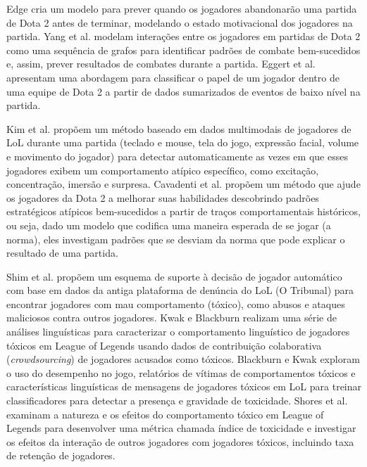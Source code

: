 Edge \cite{edge2013predicting} cria um modelo para prever quando os jogadores abandonarão uma partida de Dota 2 antes de terminar, modelando o estado motivacional dos jogadores na partida. Yang et al. \cite{yang2014identifying} modelam interações entre os jogadores em partidas de Dota 2 como uma sequência de grafos para identificar padrões de combate bem-sucedidos e, assim, prever resultados de combates durante a partida. Eggert et al. \cite{eggert2015classification} apresentam uma abordagem para classificar o papel de um jogador dentro de uma equipe de Dota 2 a partir de dados sumarizados de eventos de baixo nível na partida.

Kim et al. \cite{kim2015efficiently} propõem um método baseado em dados multimodais de jogadores de LoL durante uma partida (teclado e mouse, tela do jogo, expressão facial, volume e movimento do jogador) para detectar automaticamente as vezes em que esses jogadores exibem um comportamento atípico específico, como excitação, concentração, imersão e surpresa. Cavadenti et al. \cite{cavadenti2016did} propõem um método que ajude os jogadores da Dota 2 a melhorar suas habilidades descobrindo padrões estratégicos atípicos bem-sucedidos a partir de traços comportamentais históricos, ou seja, dado um modelo que codifica uma maneira esperada de se jogar (a norma), eles investigam padrões que se desviam da norma que pode explicar o resultado de uma partida.

Shim et al. \cite{shim2014decision} propõem um esquema de suporte à decisão de jogador automático com base em dados da antiga plataforma de denúncia do LoL (O Tribunal) para encontrar jogadores com mau comportamento (tóxico), como abusos e ataques maliciosos contra outros jogadores. Kwak e Blackburn \cite{kwak2014linguistic} realizam uma série de análises linguísticas para caracterizar o comportamento linguístico de jogadores tóxicos em League of Legends usando dados de contribuição colaborativa (\textit{crowdsourcing}) de jogadores acusados como tóxicos. Blackburn e Kwak \cite{blackburn2014stfu} exploram o uso do desempenho no jogo, relatórios de vítimas de comportamentos tóxicos e características linguísticas de mensagens de jogadores tóxicos em LoL para treinar classificadores para detectar a presença e gravidade de toxicidade. Shores et al. \cite{shores2014identification} examinam a natureza e os efeitos do comportamento tóxico em League of Legends para desenvolver uma métrica chamada índice de toxicidade e investigar os efeitos da interação de outros jogadores com jogadores tóxicos, incluindo taxa de retenção de jogadores.

